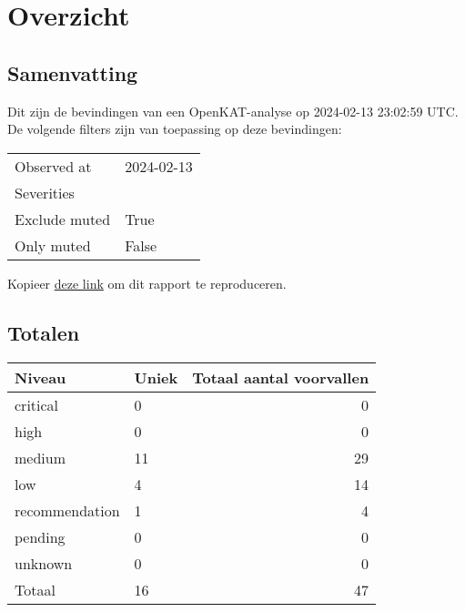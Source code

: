 \documentclass[11pt, a4paper]{report}
\begin{document}
\newpage

\chapter{Overzicht}

\section{Samenvatting}
Dit zijn de bevindingen van een OpenKAT-analyse op 2024-02-13 23:02:59 UTC. %
De volgende filters zijn van toepassing op deze bevindingen:

\begin{longtable}{ p{}  p{} }

            Observed at & 2024{-}02{-}13 \\

            Severities &  \\

            Exclude muted & True \\

            Only muted & False \\

\end{longtable}



    \noindent Kopieer \href{http://localhost:8000/nl/_rieven/findings/?observed_at=2024-02-13}{deze link} om dit rapport te reproduceren.



\bgroup{}
\def\arraystretch{1.2}
\section{Totalen}
\begin{tabular}{ llr }
	Niveau & Uniek & Totaal aantal voorvallen \\\toprule
	\toprule

		\colorbox{box-color-critical}{ \color{color-critical} critical } & 0 & 0 \\

		\colorbox{box-color-high}{ \color{color-high} high } & 0 & 0 \\

		\colorbox{box-color-medium}{ \color{color-medium} medium } & 11 & 29 \\

		\colorbox{box-color-low}{ \color{color-low} low } & 4 & 14 \\

		\colorbox{box-color-recommendation}{ \color{color-recommendation} recommendation } & 1 & 4 \\

		\colorbox{box-color-pending}{ \color{color-pending} pending } & 0 & 0 \\

		\colorbox{box-color-unknown}{ \color{color-unknown} unknown } & 0 & 0 \\

	\bottomrule
	Totaal & 16 & 47
\end{tabular}
\egroup{}
\end{document}
